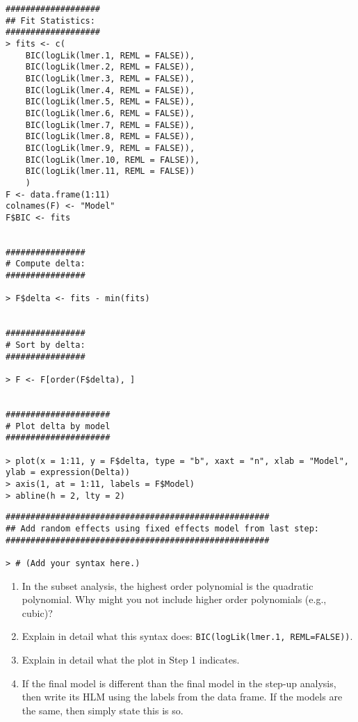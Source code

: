 \documentclass[]{article}
\begin{document}
\pagebreak
\begin{shaded}
\begin{lstlisting}
###################
## Fit Statistics:
###################
> fits <- c(
	BIC(logLik(lmer.1, REML = FALSE)),
	BIC(logLik(lmer.2, REML = FALSE)),
	BIC(logLik(lmer.3, REML = FALSE)),
	BIC(logLik(lmer.4, REML = FALSE)),
	BIC(logLik(lmer.5, REML = FALSE)),
	BIC(logLik(lmer.6, REML = FALSE)),
	BIC(logLik(lmer.7, REML = FALSE)),
	BIC(logLik(lmer.8, REML = FALSE)),
	BIC(logLik(lmer.9, REML = FALSE)),
	BIC(logLik(lmer.10, REML = FALSE)),
	BIC(logLik(lmer.11, REML = FALSE))
	)
F <- data.frame(1:11)
colnames(F) <- "Model"
F$BIC <- fits


################
# Compute delta:
################

> F$delta <- fits - min(fits)


################
# Sort by delta:
################

> F <- F[order(F$delta), ]


#####################
# Plot delta by model
#####################

> plot(x = 1:11, y = F$delta, type = "b", xaxt = "n", xlab = "Model", ylab = expression(Delta))
> axis(1, at = 1:11, labels = F$Model)
> abline(h = 2, lty = 2)
\end{lstlisting}
\end{shaded}


\pagebreak
\begin{shaded}
\begin{lstlisting}
#####################################################
## Add random effects using fixed effects model from last step:
#####################################################

> # (Add your syntax here.)
\end{lstlisting}
\end{shaded}
 

\begin{enumerate}[resume]
\item In the subset analysis, the highest order polynomial is the quadratic polynomial. Why might you not include higher order polynomials (e.g., cubic)?
\item Explain in detail what this syntax does: \verb|BIC(logLik(lmer.1, REML=FALSE))|.
\item Explain in detail what the plot in Step 1 indicates.
\item If the final model is different than the final model in the step-up analysis, then write its HLM using the labels from the data frame. If the models are the same, then simply state this is so.
\end{enumerate}
\end{document}
